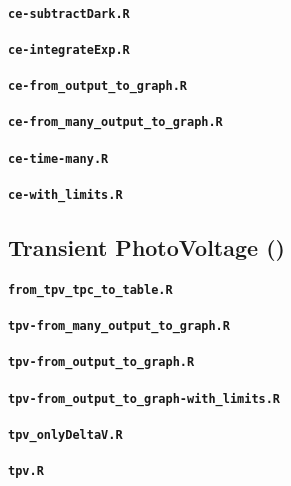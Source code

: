 \paragraph{\texttt{ce-subtractDark.R}}
\paragraph{\texttt{ce-integrateExp.R}}
\paragraph{\texttt{ce-from_output_to_graph.R}}
\paragraph{\texttt{ce-from_many_output_to_graph.R}}
\paragraph{\texttt{ce-time-many.R}}
\paragraph{\texttt{ce-with_limits.R}}

\subsection{Transient PhotoVoltage ()}\label{r_tpv}
\paragraph{\texttt{from_tpv_tpc_to_table.R}}
\paragraph{\texttt{tpv-from_many_output_to_graph.R}}
\paragraph{\texttt{tpv-from_output_to_graph.R}}
\paragraph{\texttt{tpv-from_output_to_graph-with_limits.R}}
\paragraph{\texttt{tpv_onlyDeltaV.R}}
\paragraph{\texttt{tpv.R}}



